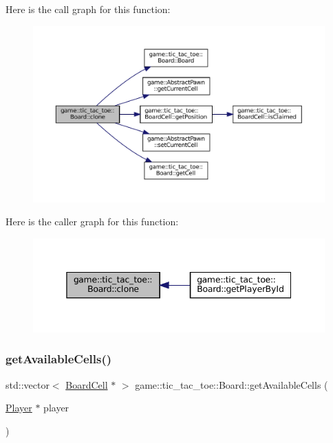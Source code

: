 Here is the call graph for this function\+:
\nopagebreak
\begin{figure}[H]
\begin{center}
\leavevmode
\includegraphics[width=350pt]{classgame_1_1tic__tac__toe_1_1_board_a9d7a2c225f06a3410b11b688d9d6bcf8_cgraph}
\end{center}
\end{figure}
Here is the caller graph for this function\+:
\nopagebreak
\begin{figure}[H]
\begin{center}
\leavevmode
\includegraphics[width=345pt]{classgame_1_1tic__tac__toe_1_1_board_a9d7a2c225f06a3410b11b688d9d6bcf8_icgraph}
\end{center}
\end{figure}
\mbox{\label{classgame_1_1tic__tac__toe_1_1_board_a68eea4b31da1c8b4cf90ff0d6bc9d232}} 
\subsubsection{\texorpdfstring{get\+Available\+Cells()}{getAvailableCells()}}
{\footnotesize\ttfamily std\+::vector$<$ \hyperlink{classgame_1_1tic__tac__toe_1_1_board_cell}{Board\+Cell} $\ast$ $>$ game\+::tic\+\_\+tac\+\_\+toe\+::\+Board\+::get\+Available\+Cells (\begin{DoxyParamCaption}\item[{\hyperlink{classgame_1_1tic__tac__toe_1_1_player}{Player} $\ast$}]{player }\end{DoxyParamCaption})\hspace{0.3cm}{\ttfamily [override]}}



